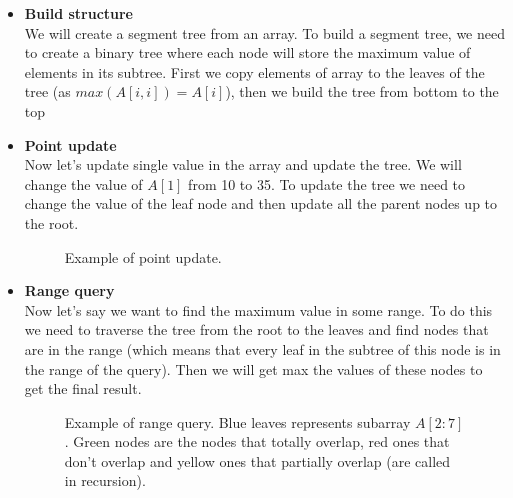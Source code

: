 \documentclass[11pt]{article}
\begin{document}
\begin{itemize}
    \item \textbf{Build structure} \\
    We will create a segment tree from an array.
    To build a segment tree, we need to create a binary tree where each node will store the maximum value of elements in its subtree.
    First we copy elements of array to the leaves of the tree (as \(max(A[i, i]) = A[i]\)), then we build the tree from bottom to the top \\
    
    \FloatBarrier
    \item \textbf{Point update} \\
    Now let's update single value in the array and update the tree.
    We will change the value of \(A[1]\) from 10 to 35.
    To update the tree we need to change the value of the leaf node 
    and then update all the parent nodes up to the root.
    
    \begin{figure}[H]
        \centering
        
        \caption{Example of point update.}
        \label{fig:segment_tree_2}
    \end{figure}

    \item \textbf{Range query} \\
    Now let's say we want to find the maximum value in some range.
    To do this we need to traverse the tree from the root to the leaves and 
    find nodes that are in the range (which means that every leaf in the subtree of this node is in the range of the query). 
    Then we will get max the values of these nodes to get the final result.

    

    \begin{figure}[H]
        \centering
        
        \caption{Example of range query. Blue leaves represents subarray \(A[2:7]\). Green nodes 
        are the nodes that totally overlap, red ones that don't overlap and yellow ones that partially overlap (are called in recursion).}
        \label{fig:segment_tree_3}
    \end{figure}

\end{itemize}
\end{document}
